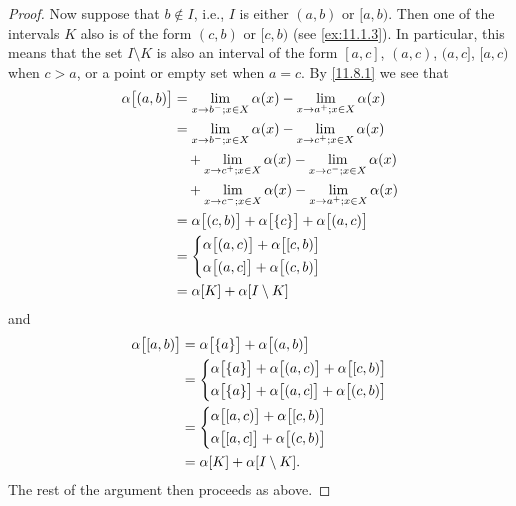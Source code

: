 \begin{proof}
  Now suppose that \(b \notin I\), i.e., \(I\) is either \((a, b)\) or \([a, b)\).
  Then one of the intervals \(K\) also is of the form \((c, b)\) or \([c, b)\) (see \cref{ex:11.1.3}).
      In particular, this means that the set \(I \setminus K\) is also an interval of the form \([a, c]\), \((a, c)\), \((a, c]\), \([a, c)\) when \(c > a\), or a point or empty set when \(a = c\).
  By \cref{11.8.1} we see that
  \begin{align*}
    \alpha\big[(a, b)\big] & = \lim_{x \to b^- ; x \in X} \alpha(x) - \lim_{x \to a^+ ; x \in X} \alpha(x)       \\
                           & = \lim_{x \to b^- ; x \in X} \alpha(x) - \lim_{x \to c^+ ; x \in X} \alpha(x)       \\
                           & \quad + \lim_{x \to c^+ ; x \in X} \alpha(x) - \lim_{x \to c^- ; x \in X} \alpha(x) \\
                           & \quad + \lim_{x \to c^- ; x \in X} \alpha(x) - \lim_{x \to a^+ ; x \in X} \alpha(x) \\
                           & = \alpha\big[(c, b)\big] + \alpha\big[\{c\}\big] + \alpha\big[(a, c)\big]           \\
                           & = \begin{dcases}
                                 \alpha\big[(a, c)\big] + \alpha\big[[c, b)\big] \\
                                   \alpha\big[(a, c]\big] + \alpha\big[(c, b)\big]
                               \end{dcases}        \\
                           & = \alpha[K] + \alpha[I \setminus K]
  \end{align*}
  and
  \begin{align*}
    \alpha\big[[a, b)\big] & = \alpha\big[\{a\}\big] + \alpha\big[(a, b)\big]                                                      \\
                           & = \begin{dcases}
                                 \alpha\big[\{a\}\big] + \alpha\big[(a, c)\big] + \alpha\big[[c, b)\big] \\
                                   \alpha\big[\{a\}\big] + \alpha\big[(a, c]\big] + \alpha\big[(c, b)\big]
                               \end{dcases} \\
                           & = \begin{dcases}
                                 \alpha\big[[a, c)\big] + \alpha\big[[c, b)\big] \\
                                 \alpha\big[[a, c]\big] + \alpha\big[(c, b)\big]
                               \end{dcases}                     \\
                           & = \alpha[K] + \alpha[I \setminus K].
  \end{align*}
  The rest of the argument then proceeds as above.
\end{proof}

